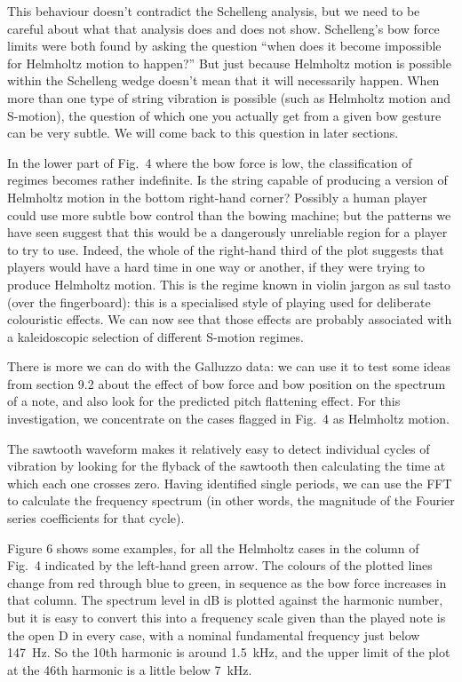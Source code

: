   This behaviour doesn't contradict the Schelleng analysis, but we need to be 
  careful about what that analysis does and does not show. Schelleng's bow 
  force limits were both found by asking the question ``when does it become 
  impossible for Helmholtz motion to happen?'' But just because Helmholtz 
  motion is possible within the Schelleng wedge doesn't mean that it will 
  necessarily happen. When more than one type of string vibration is possible 
  (such as Helmholtz motion and S-motion), the question of which one you 
  actually get from a given bow gesture can be very subtle. We will come back 
  to this question in later sections. 

  In the lower part of Fig.\ 4 where the bow force is low, the classification 
  of regimes becomes rather indefinite. Is the string capable of producing a 
  version of Helmholtz motion in the bottom right-hand corner? Possibly a human 
  player could use more subtle bow control than the bowing machine; but the 
  patterns we have seen suggest that this would be a dangerously unreliable 
  region for a player to try to use. Indeed, the whole of the right-hand third 
  of the plot suggests that players would have a hard time in one way or 
  another, if they were trying to produce Helmholtz motion. This is the regime 
  known in violin jargon as sul tasto (over the fingerboard): this is a 
  specialised style of playing used for deliberate colouristic effects. We can 
  now see that those effects are probably associated with a kaleidoscopic 
  selection of different S-motion regimes. 

  There is more we can do with the Galluzzo data: we can use it to test some 
  ideas from section 9.2 about the effect of bow force and bow position on the 
  spectrum of a note, and also look for the predicted pitch flattening effect. 
  For this investigation, we concentrate on the cases flagged in Fig.\ 4 as 
  Helmholtz motion. 

  The sawtooth waveform makes it relatively easy to detect individual cycles of 
  vibration by looking for the flyback of the sawtooth then calculating the 
  time at which each one crosses zero. Having identified single periods, we can 
  use the FFT to calculate the frequency spectrum (in other words, the 
  magnitude of the Fourier series coefficients for that cycle). 

  Figure 6 shows some examples, for all the Helmholtz cases in the column of 
  Fig.\ 4 indicated by the left-hand green arrow. The colours of the plotted 
  lines change from red through blue to green, in sequence as the bow force 
  increases in that column. The spectrum level in dB is plotted against the 
  harmonic number, but it is easy to convert this into a frequency scale given 
  than the played note is the open D in every case, with a nominal fundamental 
  frequency just below 147~Hz. So the 10th harmonic is around 1.5~kHz, and the 
  upper limit of the plot at the 46th harmonic is a little below 7~kHz. 

